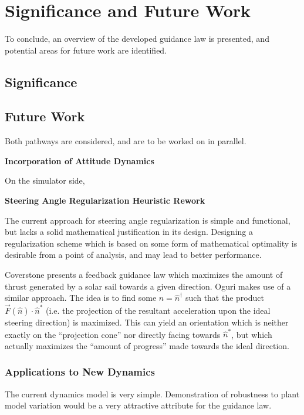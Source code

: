 \chapter{Significance and Future Work}

To conclude, an overview of the developed guidance law is presented, and potential areas for future work are identified.


\section{Significance}




\section{Future Work}



Both pathways are considered, and are to be worked on in parallel.

\textbf{Incorporation of Attitude Dynamics}

On the simulator side,

\textbf{Steering Angle Regularization Heuristic Rework}

The current approach for steering angle regularization is simple and functional, but lacks a solid mathematical justification in its design. Designing a regularization scheme which is based on some form of mathematical optimality is desirable from a point of analysis, and may lead to better performance.

Coverstone \cite{coverstone2003technique} presents a feedback guidance law which maximizes the amount of thrust generated by a solar sail towards a given direction. Oguri \cite{oguri2023solar} makes use of a similar approach. The idea is to find some $\hat{n} = \hat{n}^\dagger$ such that the product $\vec{F}(\hat{n}) \cdot \hat{n}^*$ (i.e. the projection of the resultant acceleration upon the ideal steering direction) is maximized. This can yield an orientation which is neither exactly on the ``projection cone'' nor directly facing towards $\hat{n}^*$, but which actually maximizes the ``amount of progress'' made towards the ideal direction.



\subsection{Applications to New Dynamics}
The current dynamics model is very simple. Demonstration of robustness to plant model variation would be a very attractive attribute for the guidance law.

